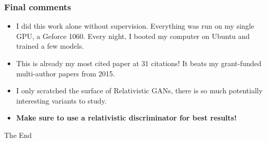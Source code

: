 \documentclass[t]{beamer}
\begin{document}
\begin{frame}
	\frametitle{Final comments}
	
	\begin{itemize}
	\item I did this work alone without supervision. Everything was run on my single GPU, a Geforce 1060. Every night, I booted my computer on Ubuntu and trained a few models. \vspace{.25cm}
	
	\item This is already my most cited paper at 31 citations! It beats my grant-funded multi-author papers from 2015.
	
	\item I only scratched the surface of Relativistic GANs, there is so much potentially interesting variants to study. 
	
	\item \textbf{Make sure to use a relativistic discriminator for best results!}
	\end{itemize}
	
\end{frame}


%	


\begin{frame}
\Huge{\centerline{The End}}
\end{frame}

\end{document}

